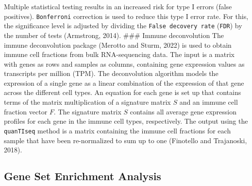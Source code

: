 \documentclass[
  parskip,
  oneside]{scrreprt}
\begin{document}
Multiple statistical testing results in an increased risk for type I
errors (false positives). \texttt{Bonferroni} correction is used to
reduce this type I error rate. For this, the significance level is
adjusted by dividing the \texttt{False\ decovery\ rate} (\texttt{FDR})
by the number of tests (Armstrong, 2014). \#\#\# Immune deconvolution
The immune deconvolution package (Merotto and Sturm, 2022) is used to
obtain immune cell fractions from bulk RNA-sequencing data. The input is
a matrix with genes as rows and samples as columns, containing gene
expression values as transcripts per million (TPM). The deconvolution
algorithm models the expression of a single gene as a linear combination
of the expression of that gene across the different cell types. An
equation for each gene is set up that contains terms of the matrix
multiplication of a signature matrix \(S\) and an immune cell fraction
vector \(F\). The signature matrix \(S\) contains all average gene
expression profiles for each gene in the immune cell types,
respectively. The output using the \texttt{quanTIseq} method is a matrix
containing the immune cell fractions for each sample that have been
re-normalized to sum up to one (Finotello and Trajanoski, 2018).

\hypertarget{gene-set-enrichment-analysis}{%
\subsection{Gene Set Enrichment
Analysis}\label{gene-set-enrichment-analysis}}
\end{document}
